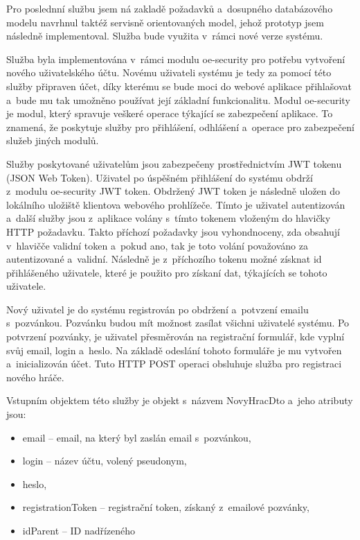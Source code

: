 \documentclass[12pt]{article}
\begin{document}
Pro poslednní službu jsem ná zakladě požadavků a~dosupného databázového modelu navrhnul taktéž servisně orientovaných model,
jehož prototyp jsem následně implementoval. Služba bude využita v~rámci nové verze systému.

\clearpage


Služba byla implementována v~rámci modulu oe-security pro potřebu vytvoření nového uživatelského účtu.
Novému uživateli systému je tedy za pomocí této služby připraven účet,
díky kterému se bude moci do webové aplikace přihlašovat a~bude mu tak umožněno používat její základní funkcionalitu.
Modul oe-security je modul, který spravuje veškeré operace týkající se zabezpečení aplikace.
To znamená, že poskytuje služby pro přihlášení, odhlášení a~operace pro zabezpečení služeb jiných modulů.

Služby poskytované uživatelům jsou zabezpečeny prostřednictvím JWT tokenu (JSON Web Token).
Uživatel po úspěšném přihlášení do systému obdrží z~modulu oe-security JWT token.
Obdržený JWT token je následně uložen do lokálního uložiště klientova webového prohlížeče. 
Tímto je uživatel autentizován a~další služby jsou z~aplikace volány s~tímto tokenem vloženým do hlavičky HTTP požadavku. 
Takto příchozí požadavky jsou vyhondnoceny, zda obsahují v~hlavičče validní token a~pokud ano, 
tak je toto volání považováno za autentizované a~validní. Následně je z~příchozího tokenu možné získnat id přihlášeného uživatele,
které je použito pro získaní dat, týkajících se tohoto uživatele.

Nový uživatel je do systému registrován po obdržení a~potvzení emailu s~pozvánkou.
Pozvánku budou mít možnost zasílat všichni uživatelé systému.
Po potvrzení pozvánky, je uživatel přesměrován na registrační
formulář, kde vyplní svůj email, login a~heslo. 
Na základě odeslání tohoto formuláře je mu vytvořen a~inicializován účet. 
Tuto HTTP POST operaci obsluhuje služba pro registraci nového hráče.

Vstupním objektem této služby je objekt s~názvem NovyHracDto a~jeho atributy jsou:
\begin{itemize}
\item email -- email, na který byl zaslán email s~pozvánkou,
\item login -- název účtu, volený pseudonym,
\item heslo,
\item registrationToken -- registrační token, získaný z~emailové pozvánky,
\item idParent -- ID nadřízeného
\end{itemize}
\end{document}
